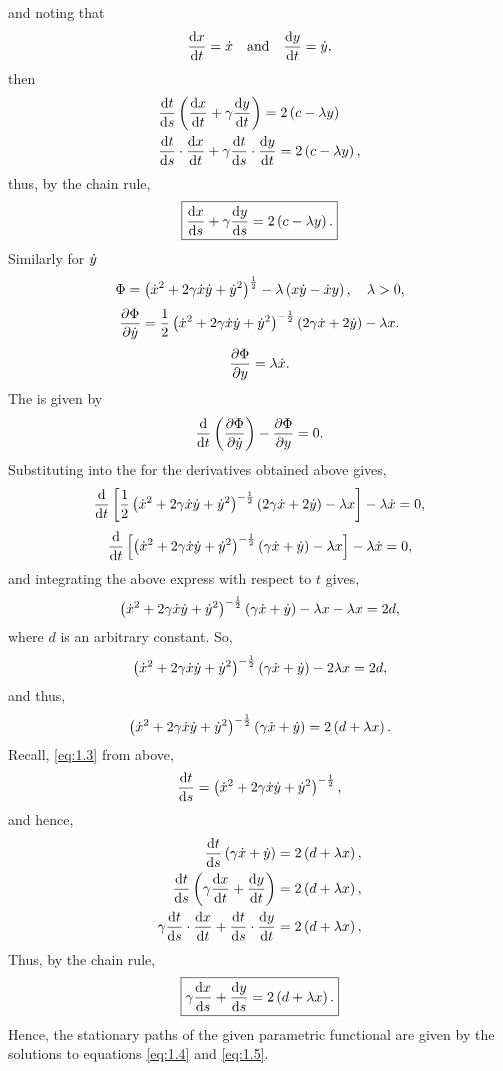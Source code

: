 and noting that
\begin{equation*}
	\frac{\mathrm{d}x}{\mathrm{d}t} = \dot{x} \quad \textrm{and} \quad \frac{\mathrm{d}y}{\mathrm{d}t} = \dot{y},
\end{equation*}
then
\begin{align*}
	{}&\frac{\mathrm{d}t}{\mathrm{d}s}\left(\frac{\mathrm{d}x}{\mathrm{d}t} + \gamma\frac{\mathrm{d}y}{\mathrm{d}t}\right) = 2\left(c - \lambda y\right)\\
	{}&\frac{\mathrm{d}t}{\mathrm{d}s}\cdot\frac{\mathrm{d}x}{\mathrm{d}t} + \gamma\frac{\mathrm{d}t}{\mathrm{d}s}\cdot\frac{\mathrm{d}y}{\mathrm{d}t} = 2\left(c - \lambda y\right),
\end{align*}
thus, by the chain rule,
\begin{equation}
	\label{eq:1.4}
	\boxed{\deriv{x}{s} + \gamma\deriv{y}{s} = 2\lr{c - \lambda y}.}
\end{equation}
Similarly for $\dot{y}$
\[
	\Phi =\left(\dot{x}^2 + 2\gamma\dot{x}\dot{y} + \dot{y}^2\right)^{\frac{1}{2}} - \lambda\left(x\dot{y} - \dot{x} y\right),\quad \lambda > 0,
\]
\[
	\frac{\partial \Phi}{\partial \dot{y}} = \frac{1}{2}\left(\dot{x}^2 + 2\gamma\dot{x}\dot{y} + \dot{y}^2\right)^{-\frac{1}{2}}\left(2\gamma\dot{x} + 2\dot{y}\right) - \lambda x.
\]
\[
	\frac{\partial \Phi}{\partial y} = \lambda\dot{x}.
\]
The \el is given by
\[
	\frac{\mathrm{d}}{\mathrm{d}t}\left(\frac{\partial \Phi}{\partial \dot{y}}\right)-\frac{\partial \Phi}{\partial y} = 0.
\]
Substituting into the \el for the derivatives obtained above gives,
\[
	\frac{\mathrm{d}}{\mathrm{d}t}\left[\frac{1}{2}\left(\dot{x}^2 + 2\gamma\dot{x}\dot{y} + \dot{y}^2\right)^{-\frac{1}{2}}\left(2\gamma\dot{x} + 2\dot{y}\right) - \lambda x\right] - \lambda \dot{x} = 0,
\]
\[
	\frac{\mathrm{d}}{\mathrm{d}t}\left[\left(\dot{x}^2 + 2\gamma\dot{x}\dot{y} + \dot{y}^2\right)^{-\frac{1}{2}}\left(\gamma\dot{x} + \dot{y}\right) - \lambda x\right] - \lambda \dot{x} = 0,
\]
and integrating the above express with respect to $t$ gives,
\[
	\left(\dot{x}^2 + 2\gamma\dot{x}\dot{y} + \dot{y}^2\right)^{-\frac{1}{2}}\left(\gamma\dot{x} + \dot{y}\right) - \lambda x - \lambda x = 2d,
\]
where $d$ is an arbitrary constant. So,
\[
	\left(\dot{x}^2 + 2\gamma\dot{x}\dot{y} + \dot{y}^2\right)^{-\frac{1}{2}}\left(\gamma\dot{x} + \dot{y}\right) - 2 \lambda x = 2d,
\]
and thus,
\begin{equation*}
	\left(\dot{x}^2 + 2\gamma\dot{x}\dot{y} + \dot{y}^2\right)^{-\frac{1}{2}}\left(\gamma\dot{x} + \dot{y}\right) = 2\left(d + \lambda x\right).
\end{equation*}
Recall, \eqref{eq:1.3} from above,
\begin{equation*}
	\frac{\mathrm{d}t}{\mathrm{d}s} = \left(\dot{x}^2 + 2\gamma\dot{x}\dot{y} + \dot{y}^2\right)^{-\frac{1}{2}},
\end{equation*}
and hence,
\begin{align*}
	\frac{\mathrm{d}t}{\mathrm{d}s}\left(\gamma\dot{x} + \dot{y}\right) = 2\left(d + \lambda x\right),\\
	\frac{\mathrm{d}t}{\mathrm{d}s}\left(\gamma\frac{\mathrm{d}x}{\mathrm{d}t} +\frac{\mathrm{d}y}{\mathrm{d}t}\right) = 2\left(d+\lambda x\right),\\
	\gamma\frac{\mathrm{d}t}{\mathrm{d}s}\cdot\frac{\mathrm{d}x}{\mathrm{d}t} + \frac{\mathrm{d}t}{\mathrm{d}s}\cdot\frac{\mathrm{d}y}{\mathrm{d}t} = 2\left(d+\lambda x\right),\\
\end{align*}
Thus, by the chain rule,
\begin{equation}
	\label{eq:1.5}
	\boxed{\gamma\deriv{x}{s} + \deriv{y}{s} = 2\lr{d + \lambda x}.}
\end{equation}
Hence, the stationary paths of the given parametric functional are given by the solutions to equations \eqref{eq:1.4} and \eqref{eq:1.5}.